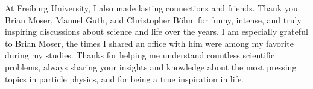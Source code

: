 At Freiburg University, I also made lasting connections and friends. Thank you Brian Moser, Manuel Guth, and Christopher Böhm for funny, intense, and truly inspiring discussions about science and life over the years.
I am especially grateful to Brian Moser, the times I shared an office with him were among my favorite during my studies. Thanks for helping me understand countless scientific problems, always sharing your insights and knowledge about the most pressing topics in particle physics, and for being a true inspiration in life.





